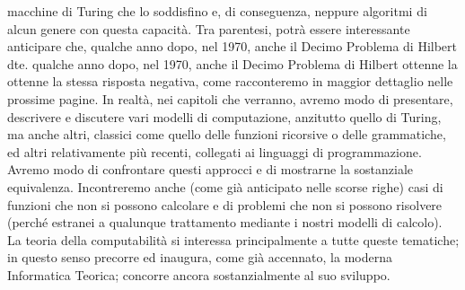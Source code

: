 macchine di Turing che lo soddisfino e, di conseguenza, neppure algoritmi di alcun genere con questa capacità.
Tra parentesi, potrà essere interessante anticipare che, qualche anno dopo, nel 1970, anche il Decimo Problema di Hilbert
dte. qualche anno dopo, nel 1970, anche il Decimo Problema di Hilbert ottenne la
ottenne la stessa risposta negativa, come racconteremo in maggior dettaglio nelle prossime pagine.
In realtà, nei capitoli che verranno, avremo modo di presentare, descrivere e discutere vari modelli di computazione,
anzitutto quello di Turing, ma anche altri,
classici come quello delle funzioni ricorsive o delle grammatiche, ed altri relativamente più recenti,
collegati ai linguaggi di programmazione. Avremo modo
di confrontare questi approcci e di mostrarne la sostanziale equivalenza. Incontreremo anche
(come già anticipato nelle scorse righe) casi di funzioni che non
si possono calcolare e di problemi che non si possono risolvere (perché estranei
a qualunque trattamento mediante i nostri modelli di calcolo). La teoria della
computabilità si interessa principalmente a tutte queste tematiche; in questo senso precorre ed inaugura,
come già accennato, la moderna Informatica Teorica;
concorre ancora sostanzialmente al suo sviluppo.